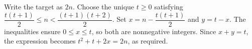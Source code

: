 Write the target as $ 2n $. Choose the unique $ t\ge0 $ satisfying $\dfrac{t(t+1)}{2}\le n<\dfrac{(t+1)(t+2)}{2}$. Set $ x=n-\dfrac{t(t+1)}{2}$ and $ y=t-x $. The inequalities ensure $ 0\le x\le t $, so both are nonnegative integers. Since $ x+y=t $, the expression becomes $ t^2+t+2x=2n $, as required.
